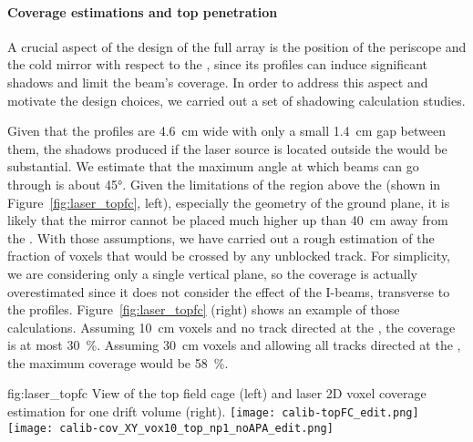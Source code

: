 \paragraph{Coverage estimations and top  penetration}
\label{sec:lasercoverage}

A crucial aspect of the design of the full array is the position of the periscope and the cold mirror with respect to the , since its profiles can induce significant shadows and limit the beam's coverage. In order to address this aspect and motivate the design choices, we carried out a set of shadowing calculation studies.

Given that the  profiles are \SI{4.6}{\cm} wide with only a small \SI{1.4}{\cm} gap between them, the shadows produced if the laser source is located outside the  would be substantial. We estimate that the maximum angle at which beams can go through is about \ang{45}. Given the limitations of the region above the  (shown in Figure~\ref{fig:laser_topfc}, left), especially the geometry of the ground plane, it is likely that the mirror cannot be placed much higher up than \SI{40}{\cm} away from the . 
With those assumptions, we have carried out a rough estimation of the fraction of voxels that would be crossed by any unblocked track. For simplicity, we are considering only a single vertical plane, so the coverage is actually overestimated since it does not consider the effect of the  I-beams, transverse to the  profiles.
Figure~\ref{fig:laser_topfc} (right) shows an example of those calculations. Assuming \SI{10}{\cm} voxels and no track directed at the , the coverage is at most \SI{30}{\%}. Assuming \SI{30}{\cm} voxels and allowing all tracks directed at the , the maximum coverage would be \SI{58}{\%}.

\begin{dunefigure}{fig:laser_topfc}
{View of the top field cage (left) and laser 2D voxel coverage estimation for one drift volume (right).}
\texttt{[image: calib-topFC\_edit.png]}
\texttt{[image: calib-cov\_XY\_vox10\_top\_np1\_noAPA\_edit.png]}
\end{dunefigure}

